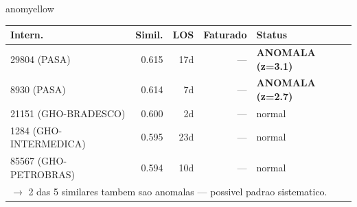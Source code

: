 \documentclass[a4paper,10pt]{article}
\begin{document}
\begin{anomalycard}[Internacao 167679 | GHO-PETROBRAS | MODERADO (z=2.46)]{anomyellow}
\begin{tabular}{l r r r l}\toprule\textbf{Intern.} & \textbf{Simil.} & \textbf{LOS} & \textbf{Faturado} & \textbf{Status} \\\midrule
29804 (PASA) & 0.615 & 17d & --- & \textcolor{anomred}{\textbf{ANOMALA (z=3.1)}} \\
8930 (PASA) & 0.614 & 7d & --- & \textcolor{anomred}{\textbf{ANOMALA (z=2.7)}} \\
21151 (GHO-BRADESCO) & 0.600 & 2d & --- & \textcolor{jcubeblue}{normal} \\
1284 (GHO-INTERMEDICA) & 0.595 & 23d & --- & \textcolor{jcubeblue}{normal} \\
85567 (GHO-PETROBRAS) & 0.594 & 10d & --- & \textcolor{jcubeblue}{normal} \\
\multicolumn{5}{l}{\textcolor{anomred}{\small $\rightarrow$ 2 das 5 similares tambem sao anomalas --- possivel padrao sistematico.}} \\
\bottomrule\end{tabular}


\end{anomalycard}

\newpage
\end{document}
